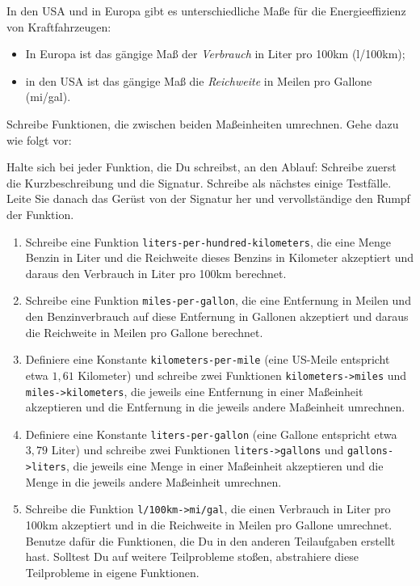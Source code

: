 \begin{aufgabe}

  In den USA und in Europa gibt es unterschiedliche
  Maße für die Energieeffizienz von Kraftfahrzeugen:
  \begin{itemize}
  \item In Europa ist das gängige Maß der \emph{Verbrauch} in Liter
    pro 100km (l/100km);
  \item in den USA ist das gängige Maß die \emph{Reichweite} in Meilen
    pro Gallone (mi/gal).
  \end{itemize}
  Schreibe Funktionen, die zwischen beiden Maßeinheiten
  umrechnen.  Gehe dazu wie folgt vor:

  Halte sich bei jeder Funktion, die Du schreibst, an den
  Ablauf: Schreibe zuerst die Kurzbeschreibung
  und die Signatur.  Schreibe als nächstes einige Testfälle.
  Leite Sie danach das Gerüst von der Signatur her und vervollständige
  den Rumpf der Funktion.

  \begin{enumerate}

  \item Schreibe eine Funktion
    \texttt{liters-per-hundred-kilometers}, die eine Menge Benzin in
    Liter und die Reichweite dieses Benzins in Kilometer akzeptiert
    und daraus den Verbrauch in Liter pro 100km berechnet.

  \item Schreibe eine Funktion
    \texttt{miles-per-gallon}, die eine Entfernung in Meilen und den
    Benzinverbrauch auf diese Entfernung in Gallonen akzeptiert und
    daraus die Reichweite in Meilen pro Gallone berechnet.

  \item Definiere eine Konstante
    \texttt{kilometers-per-mile} (eine US-Meile entspricht etwa $1,61$
    Kilometer) und schreibe zwei Funktionen
    \texttt{kilometers->miles} und \texttt{miles->kilometers}, die
    jeweils eine Entfernung in einer Maßeinheit akzeptieren und die
    Entfernung in die jeweils andere Maßeinheit umrechnen.

  \item Definiere eine Konstante
    \texttt{liters-per-gallon} (eine Gallone entspricht etwa $3,79$
    Liter) und schreibe zwei Funktionen \texttt{liters->gallons}
    und \texttt{gallons->liters}, die jeweils eine Menge in einer
    Maßeinheit akzeptieren und die Menge in die jeweils andere
    Maßeinheit umrechnen.

  \item Schreibe die Funktion
    \texttt{l/100km->mi/gal}, die einen Verbrauch in Liter pro 100km
    akzeptiert und in die Reichweite in Meilen pro Gallone umrechnet.
    Benutze dafür die Funktionen, die Du in den anderen
    Teilaufgaben erstellt hast.  Solltest Du auf weitere Teilprobleme
    stoßen, abstrahiere diese Teilprobleme in eigene Funktionen.


\end{enumerate}
\end{aufgabe}
